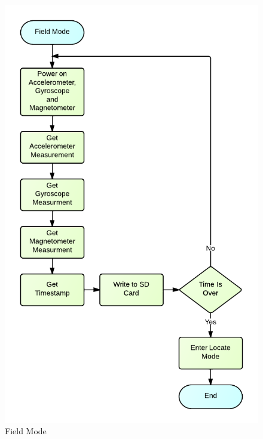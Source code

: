 \begin{figure}[H]
	\centering
	\includegraphics[scale=1.0]{img/FieldMode.pdf}
	\caption{Field Mode \label{fig:fieldMode}}
\end{figure}

